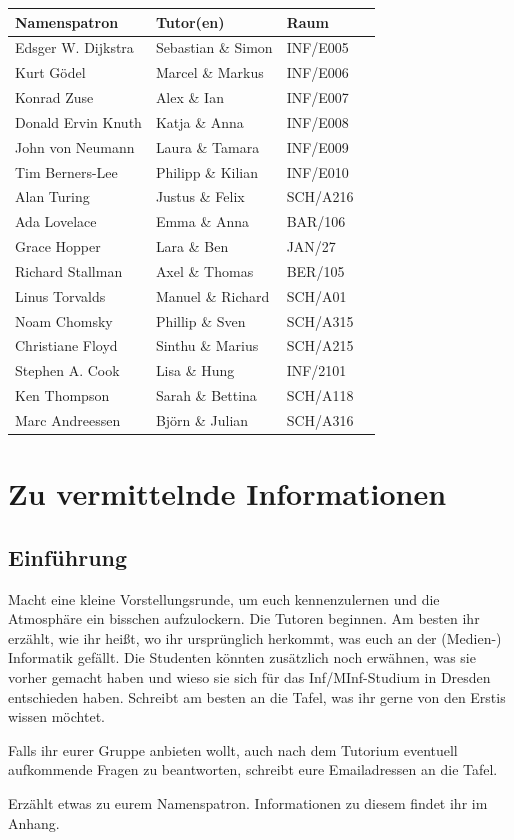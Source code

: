 \documentclass[a4paper,12pt]{report}
\begin{document}
\begin{center}
\vspace{1cm}
\begin{tabular}[h]{|l|l|l|l|}
	\hline
	\textbf{Namenspatron} & \textbf{Tutor(en)} & \textbf{Raum}\\ \hline
	Edsger W. Dijkstra & Sebastian \& Simon & INF/E005\\
	Kurt Gödel & Marcel \& Markus & INF/E006\\
	Konrad Zuse & Alex \& Ian & INF/E007\\
	Donald Ervin Knuth & 	Katja \& Anna & INF/E008\\
	John von Neumann & Laura \& Tamara & INF/E009\\
	Tim Berners-Lee & Philipp \& Kilian & INF/E010\\
	Alan Turing & Justus \& Felix & SCH/A216\\
	Ada Lovelace & Emma \& Anna & BAR/106\\
	Grace Hopper & Lara \& Ben & JAN/27\\
	Richard Stallman & Axel \& Thomas & BER/105\\
	Linus Torvalds & Manuel \& Richard & SCH/A01\\
	Noam Chomsky & Phillip \& Sven & SCH/A315\\
	Christiane Floyd & Sinthu \& Marius & SCH/A215\\
	Stephen A. Cook & Lisa \& Hung & INF/2101\\
	Ken Thompson & Sarah \& Bettina & SCH/A118\\
	Marc Andreessen & Björn \& Julian & SCH/A316\\
	\hline
\end{tabular}
\end{center}

\chapter{Zu vermittelnde Informationen}

\section{Einführung}
\begin{itemize*}
\item Macht eine kleine Vorstellungsrunde, um euch kennenzulernen und die Atmosphäre ein bisschen aufzulockern.
Die Tutoren beginnen.
Am besten ihr erzählt, wie ihr heißt, wo ihr ursprünglich herkommt, was euch an der (Medien-) Informatik gefällt.
Die Studenten könnten zusätzlich noch erwähnen, was sie vorher gemacht haben und wieso sie sich für das Inf/MInf-Studium in Dresden entschieden haben.
Schreibt am besten an die Tafel, was ihr gerne von den Erstis wissen möchtet.
\item Falls ihr eurer Gruppe anbieten wollt, auch nach dem Tutorium eventuell aufkommende Fragen zu beantworten, schreibt eure Emailadressen an die Tafel.
\item Erzählt etwas zu eurem Namenspatron. Informationen zu diesem findet ihr im Anhang.
\end{itemize*}
\end{document}
